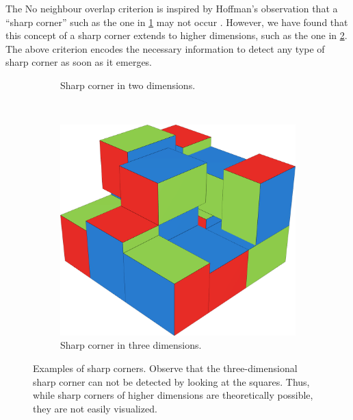 \begin{remark}
The No neighbour overlap criterion  is inspired by Hoffman's observation that a ``sharp corner'' such as the one in \cref{fig:3d-sharp-corner-square} may not occur \cite[p. 221]{Hoffman1981}. However, we have found that this concept of a sharp corner extends to higher dimensions, such as the one in \cref{fig:3d-sharp-corner-cube}. The above criterion encodes the necessary information to detect any type of sharp corner as soon as it emerges.
\begin{figure}[ht]
    \centering
    \begin{subfigure}[b]{0.47\textwidth}
        \centering
            \begin{tikzpicture}[scale=0.35]
                
            \end{tikzpicture}
        \caption{Sharp corner in two dimensions.}
        \label{fig:3d-sharp-corner-square}
    \end{subfigure}
    ~
    \begin{subfigure}[b]{0.47\textwidth}
        \centering
            \includegraphics[scale=0.23]{graphics/3d-cube-sharp-corner.png}
        \caption{Sharp corner in three dimensions.}
        \label{fig:3d-sharp-corner-cube}
    \end{subfigure}
    \caption{Examples of sharp corners. Observe that the three-dimensional sharp corner can not be detected by looking at the squares. Thus, while sharp corners of higher dimensions are theoretically possible, they are not easily visualized.}
    \label{fig:3d-sharp-corners}
\end{figure}
\end{remark}

